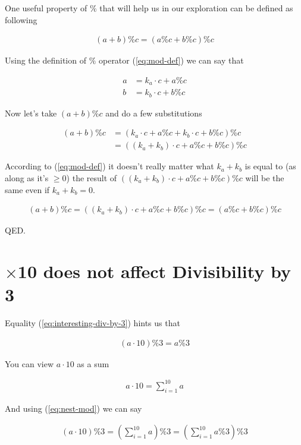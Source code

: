 \documentclass{article}
\begin{document}
One useful property of $\%$ that will help us in our exploration can be defined as following

\begin{align} \label{eq:nest-mod}
  (a + b)\%c = (a\%c + b\%c)\%c
\end{align}

Using the definition of $\%$ operator (\ref{eq:mod-def}) we can say that

\begin{align*}
  a &= k_a\cdot c + a\%c \\
  b &= k_b\cdot c + b\%c
\end{align*}

Now let's take $(a + b)\%c$ and do a few substitutions

\begin{align*}
  (a + b)\%c
      &= (k_a\cdot c + a\%c + k_b\cdot c + b\%c)\%c \\
      &= ((k_a + k_b)\cdot c + a\%c + b\%c)\%c
\end{align*}

According to (\ref{eq:mod-def}) it doesn't really matter what $k_a +
k_b$ is equal to (as along as it's $\ge 0$) the result of $((k_a +
k_b)\cdot c + a\%c + b\%c)\%c$ will be the same even if $k_a + k_b =
0$.

\begin{align*}
  (a + b)\%c = ((k_a + k_b)\cdot c + a\%c + b\%c)\%c = (a\%c + b\%c)\%c
\end{align*}

QED.

\section{$\times$10 does not affect Divisibility by 3}

Equality (\ref{eq:interesting-div-by-3}) hints us that

\begin{align} \label{eq:remove-10}
  (a \cdot 10)\%3 = a\%3
\end{align}

You can view $a \cdot 10$ as a sum

\begin{align*}
  a \cdot 10 = \sum_{i=1}^{10}a
\end{align*}

And using (\ref{eq:nest-mod}) we can say

\begin{align*}
  (a \cdot 10)\%3 = \left(\sum_{i=1}^{10}a\right)\%3 = \left(\sum_{i=1}^{10}a\%3\right)\%3
\end{align*}
\end{document}
